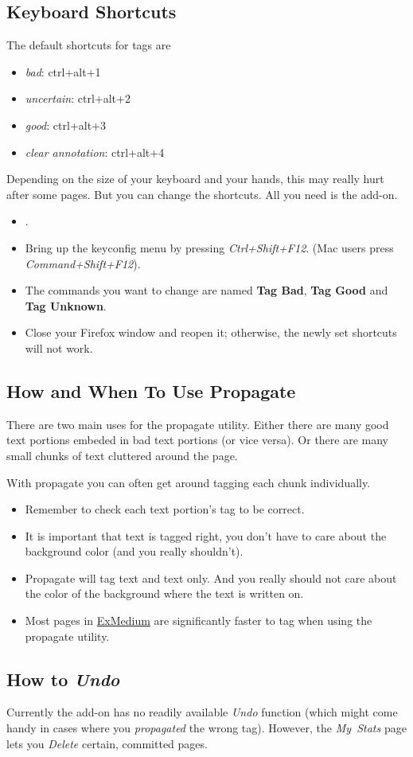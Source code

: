 \documentclass[12pt]{article}
\begin{document}
\subsection{Keyboard Shortcuts}
The default shortcuts for tags are \\
\begin{itemize}
	\item \emph{bad}: ctrl+alt+1
	\item \emph{uncertain}: ctrl+alt+2
	\item \emph{good}: ctrl+alt+3
	\item \emph{clear annotation}: ctrl+alt+4
\end{itemize}

Depending on the size of your keyboard and your hands, this may really hurt after some pages. But you can change the shortcuts. All you need is the  add-on.

\begin{itemize}
	\item {}.
	\item Bring up the keyconfig menu by pressing \emph{Ctrl+Shift+F12}. (Mac users press \emph{Command+Shift+F12}).
	\item The commands you want to change are named \textbf{Tag Bad}, \textbf{Tag Good} and \textbf{Tag Unknown}.
	\item Close your Firefox window and reopen it; otherwise, the newly set shortcuts will not work.
\end{itemize}


\subsection{How and When To Use Propagate}
\label{TnTProp}
There are two main uses for the propagate utility. Either there are many good text portions embeded in bad text portions (or vice versa). Or there are many small chunks of text cluttered around the page.

With propagate you can often get around tagging each chunk individually.

\begin{itemize}
\item Remember to check each text portion's tag to be correct. \\
\item It is important that text is tagged right, you don't have to care about the background color (and you really shouldn't). \\
\item Propagate will tag text and text only. And you really should not care about the color of the background where the text is written on. \\
\item Most pages in \hyperref{Examples - Medium}{Examples - Medium, page ~}{}{ExMedium} are significantly faster to tag when using the propagate utility. \\
\end{itemize}


\subsection{How to \emph{Undo}}
Currently the add-on has no readily available \emph{Undo} function (which might come handy in cases where you \emph{propagated} the wrong tag). However, the \emph{My~Stats} page lets you \emph{Delete} certain, committed pages. 
\end{document}
